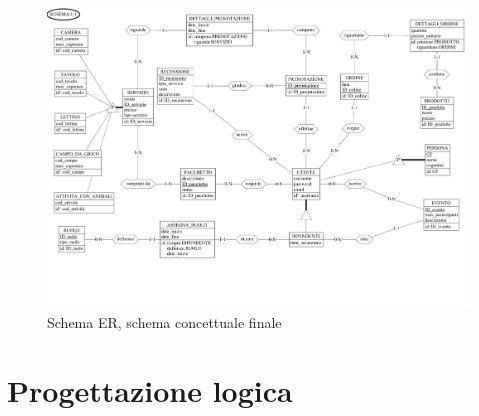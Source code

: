 \documentclass[a4paper,12pt]{report}
\begin{document}
\begin{figure}[H]
	\centering
	\includegraphics[width=\textwidth, trim=0 100pt 0 0, clip, angle=0]{./pdf/finale.pdf}
	\caption{Schema ER, schema concettuale finale}
	\label{fig:schema-finale}
\end{figure}
\newpage

\chapter{Progettazione logica}
\end{document}
